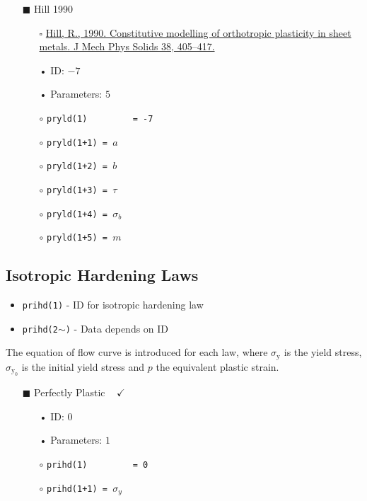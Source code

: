\documentclass[11pt,a4paper,twoside,final,onecolumn,titlepage]{article}
\newcommand{\verified}{\hspace{0.5pt} {\LARGE $\checkmark$}}
\begin{document}
\newpage
\begin{itemize}
	\item[\tiny$\blacksquare$] Hill 1990
	\begin{itemize}
		\item[\tiny$\square$] {\small \href{https://doi.org/10.1016/0022-5096(90)90006-p}{Hill, R., 1990. Constitutive modelling of orthotropic plasticity in sheet metals. J Mech Phys Solids 38, 405–417.}}\\
		\item[•] ID: $-7$
		\item[•] Parameters: $5$\\
		\item[$\circ$] \texttt{pryld(1)\,\,\,\,\,\,\,\,\,= -7}
		\item[$\circ$] \texttt{pryld(1+1) = $a$}
		\item[$\circ$] \texttt{pryld(1+2) = $b$}
		\item[$\circ$] \texttt{pryld(1+3) = $\tau$}
		\item[$\circ$] \texttt{pryld(1+4) = $\sigma_{b}$}
		\item[$\circ$] \texttt{pryld(1+5) = $m$}\\
	\end{itemize}
\end{itemize}

\vspace{0.2cm}
\subsection{Isotropic Hardening Laws}
\vspace{0.2cm}

\begin{itemize}
	\item \texttt{prihd(1)} - ID for isotropic hardening law
	\item \texttt{prihd(2$\mathtt{\sim}$)} - Data depends on ID
\end{itemize}

\noindent The equation of flow curve is introduced for each law, where $\sigma_{\textrm{y}}$ is the yield stress, $\sigma_{\textrm{y}_0}$ is the initial yield stress and $p$ the equivalent plastic strain.
\vspace{0.1cm}

\begin{itemize}
	\item[\tiny$\blacksquare$] Perfectly Plastic\,\,\,\,\,\verified{} 
	\begin{itemize}
		\item[•] ID: $0$
		\item[•] Parameters: $1$\\
		\item[$\circ$] \texttt{prihd(1)\,\,\,\,\,\,\,\,\,= 0}
		\item[$\circ$] \texttt{prihd(1+1) = $\sigma_{y}$}\\
	\end{itemize}
\end{itemize}
\end{document}
